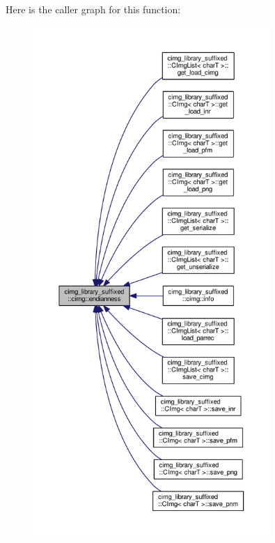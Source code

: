 Here is the caller graph for this function\+:
\nopagebreak
\begin{figure}[H]
\begin{center}
\leavevmode
\includegraphics[height=550pt]{d4/d9b/namespacecimg__library__suffixed_1_1cimg_afd898f29e094a625d15928ed19a6b69d_icgraph}
\end{center}
\end{figure}
\mbox{\label{namespacecimg__library__suffixed_1_1cimg_a4574a27654d00ba42a108368fa9d7e64}} 
